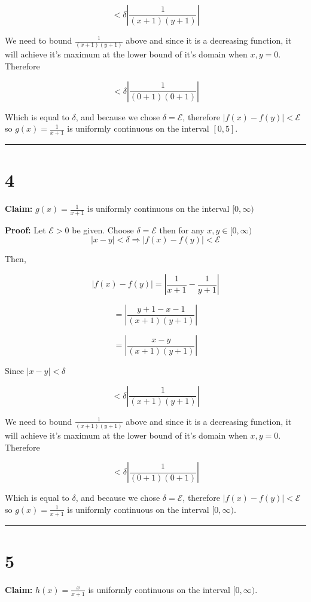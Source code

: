 \documentclass[10pt,letterpaper]{article}
\newcommand\E{\mathcal{E}}
\newcommand\qedsym{\hfill \rule{2mm}{2mm}}
\begin{document}
\[< \delta\left|\frac{1}{(x+1)(y+1)}\right|\]

We need to bound $\frac{1}{(x+1)(y+1)}$ above and since it is a decreasing function, it will achieve it's maximum at the lower bound of it's domain when $x,y = 0$. Therefore

\[ < \delta\left|\frac{1}{(0+1)(0+1)}\right|\]

Which is equal to $\delta$, and because we chose $\delta=\E$, therefore $\left|f(x)-f(y)\right|<\E$ so $g(x) = \frac{1}{x+1}$ is uniformly continuous on the interval $[0,5]$.

\qedsym

\section*{4}

\textbf{Claim:} $g(x) = \frac{1}{x+1}$ is uniformly continuous on the interval $[0,\infty)$

\medskip

\textbf{Proof:} Let $\E > 0$ be given. Choose $\delta = \E$ then for any $x, y \in [0,\infty)$ \[|x-y| < \delta \Rightarrow |f(x) - f(y)| < \E\]

Then,

\[|f(x) - f(y)| = \left|\frac{1}{x+1} - \frac{1}{y+1}\right|\]

\[ = \left|\frac{y+1-x-1}{(x+1)(y+1)}\right|\]

\[ = \left|\frac{x-y}{(x+1)(y+1)}\right|\]

Since $|x-y| < \delta$

\[< \delta\left|\frac{1}{(x+1)(y+1)}\right|\]

We need to bound $\frac{1}{(x+1)(y+1)}$ above and since it is a decreasing function, it will achieve it's maximum at the lower bound of it's domain when $x,y = 0$. Therefore

\[ < \delta\left|\frac{1}{(0+1)(0+1)}\right|\]

Which is equal to $\delta$, and because we chose $\delta=\E$, therefore $\left|f(x)-f(y)\right|<\E$ so $g(x) = \frac{1}{x+1}$ is uniformly continuous on the interval $[0,\infty)$.

\qedsym

\section*{5}

\textbf{Claim:} $h(x) = \frac{x}{x+1}$ is uniformly continuous on the interval $[0, \infty)$.
\end{document}
